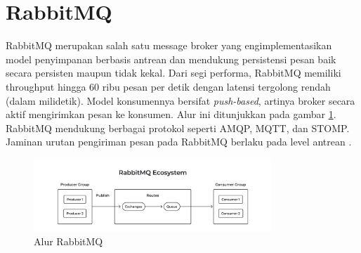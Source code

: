 \section{RabbitMQ}

RabbitMQ merupakan salah satu message broker yang engimplementasikan model penyimpanan berbasis antrean dan mendukung persistensi pesan baik secara persisten maupun tidak kekal. Dari segi performa, RabbitMQ memiliki throughput hingga 60 ribu pesan per detik dengan latensi tergolong rendah (dalam milidetik). Model konsumennya bersifat \textit{push-based}, artinya broker secara aktif mengirimkan pesan ke konsumen. Alur ini ditunjukkan pada gambar \ref{fig:rabbitmq-flow}. RabbitMQ mendukung berbagai protokol seperti AMQP, MQTT, dan STOMP. Jaminan urutan pengiriman pesan pada RabbitMQ berlaku pada level antrean \parencite{arshadChoosingTheRightMessaging}.

\begin{figure}[htbp]
    \centering
    \includegraphics[width=0.8\textwidth]{resources/chapter-2/rabbitmq.jpeg}
    \caption{Alur RabbitMQ \parencite{royNatsRmqKafka}}
    \label{fig:rabbitmq-flow}
\end{figure}

